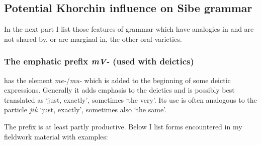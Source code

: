 \documentclass[output=paper,colorlinks,citecolor=brown]{langscibook}
\begin{document}
\subsection{Potential Khorchin influence on Sibe grammar}

In the next part I list those features of  grammar which have analogies in  and are not shared by, or are marginal in, the other oral  varieties. 

\subsubsection{The emphatic prefix \textit{mV-} (used with deictics)}


 has the element \textit{me-}/\textit{mu-} which is added to the beginning of some deictic expressions. Generally it adds emphasis to the deictics and is possibly best translated as ‘just, exactly’, sometimes ‘the very’. Its use is often analogous to the  particle \textit{jiù} ‘just, exactly’, sometimes also ‘the same’.

The prefix  is at least partly productive. Below I list forms encountered in my fieldwork material with examples:
\end{document}
